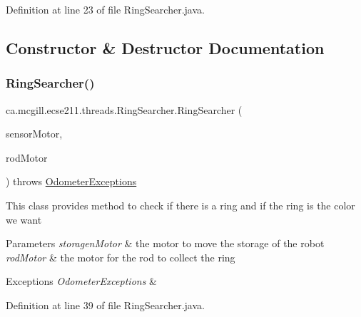 Definition at line 23 of file Ring\+Searcher.\+java.



\subsection{Constructor \& Destructor Documentation}
\mbox{\label{classca_1_1mcgill_1_1ecse211_1_1threads_1_1_ring_searcher_af36dd15db12c915245199bef646137ed}} 
\subsubsection{\texorpdfstring{Ring\+Searcher()}{RingSearcher()}}
{\footnotesize\ttfamily ca.\+mcgill.\+ecse211.\+threads.\+Ring\+Searcher.\+Ring\+Searcher (\begin{DoxyParamCaption}\item[{E\+V3\+Large\+Regulated\+Motor}]{sensor\+Motor,  }\item[{E\+V3\+Large\+Regulated\+Motor}]{rod\+Motor }\end{DoxyParamCaption}) throws \hyperlink{classca_1_1mcgill_1_1ecse211_1_1odometer_1_1_odometer_exceptions}{Odometer\+Exceptions}}

This class provides method to check if there is a ring and if the ring is the color we want


\begin{DoxyParams}{Parameters}
{\em storagen\+Motor} & the motor to move the storage of the robot \\
\hline
{\em rod\+Motor} & the motor for the rod to collect the ring \\
\hline
\end{DoxyParams}

\begin{DoxyExceptions}{Exceptions}
{\em Odometer\+Exceptions} & \\
\hline
\end{DoxyExceptions}


Definition at line 39 of file Ring\+Searcher.\+java.


